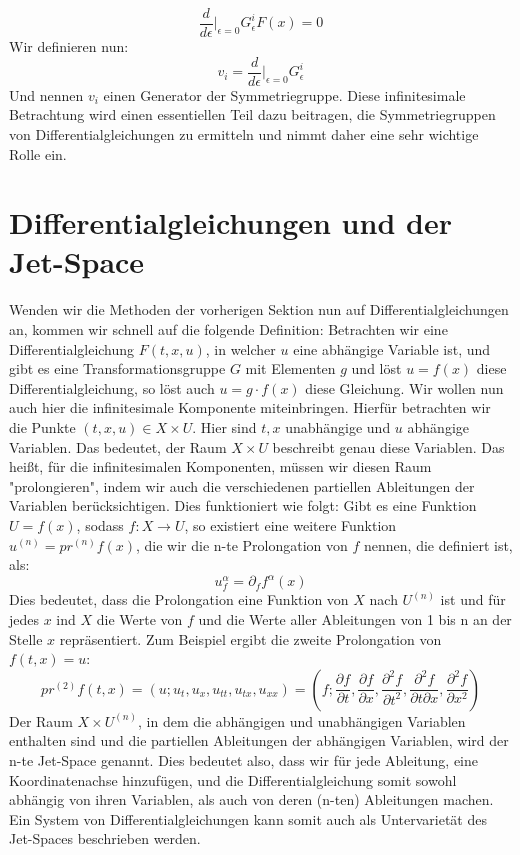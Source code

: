 \documentclass[a4paper]{article}
\begin{document}
\begin{equation}
    \frac{d}{d\epsilon}\biggl|_{\epsilon=0}G^i_\epsilon
F(x)=0 \end{equation} Wir definieren nun: \begin{equation}
    v_i=\frac{d}{d\epsilon}\biggl|_{\epsilon=0}G^i_\epsilon
\end{equation}
Und nennen $v_i$ einen Generator der Symmetriegruppe.
Diese infinitesimale Betrachtung wird einen essentiellen Teil dazu
beitragen, die Symmetriegruppen von Differentialgleichungen zu
ermitteln und nimmt daher eine sehr wichtige Rolle ein.
\section{Differentialgleichungen und der Jet-Space} Wenden wir die
Methoden der vorherigen Sektion nun auf Differentialgleichungen an,
kommen wir schnell auf die folgende Definition: Betrachten wir eine
Differentialgleichung $F(t,x,u)$,  in welcher $u$ eine abhängige
Variable ist, und gibt es eine Transformationsgruppe $G$ mit
Elementen $g$ und löst $u=f(x)$ diese Differentialgleichung, so löst
auch $u=g\cdot f(x)$ diese Gleichung.  \newline Wir wollen nun auch
hier die infinitesimale Komponente miteinbringen. Hierfür betrachten
wir die Punkte $(t,x,u)\in X\times U$. Hier sind $t,x$ unabhängige
und $u$ abhängige Variablen. Das bedeutet, der Raum $X\times U$
beschreibt genau diese Variablen. Das heißt, für die infinitesimalen
Komponenten, müssen wir diesen Raum "prolongieren", indem wir auch
die verschiedenen partiellen Ableitungen der Variablen
berücksichtigen. Dies funktioniert wie folgt: Gibt es eine Funktion
$U=f(x)$, sodass $f: X\rightarrow U$, so existiert eine weitere
Funktion $u^{(n)}=pr^{(n)}f(x)$, die wir die n-te Prolongation von
$f$ nennen, die definiert ist, als: \begin{equation}
u^\alpha_f=\partial_f f^\alpha(x) \end{equation} Dies bedeutet, dass
die Prolongation eine Funktion von $X$ nach $U^{(n)}$ ist und für
jedes $x$ ind $X$ die Werte von $f$ und die Werte aller Ableitungen
von 1 bis n an der Stelle $x$ repräsentiert. Zum Beispiel ergibt die
zweite Prolongation von $f(t,x)=u$:
\begin{equation}
    pr^{(2)}f(t,x)=(u;u_t,u_x,u_{tt},u_{tx},u_{xx})=(f;\frac{\partial
f}{\partial t},\frac{\partial f}{\partial x}, \frac{\partial^2
f}{\partial t^2},\frac{\partial^2 f}{\partial t\partial
x},\frac{\partial^2 f}{\partial x^2})
\end{equation}
Der Raum
$X\times U^{(n)}$, in dem die abhängigen und unabhängigen
Variablen enthalten sind und die partiellen Ableitungen der
abhängigen Variablen, wird der n-te Jet-Space genannt.  \newline
Dies bedeutet also, dass wir für jede Ableitung, eine
Koordinatenachse hinzufügen, und die Differentialgleichung somit
sowohl abhängig von ihren Variablen, als auch von deren (n-ten)
Ableitungen machen. Ein System von Differentialgleichungen kann
somit auch als Untervarietät des Jet-Spaces beschrieben werden.
\end{document}
